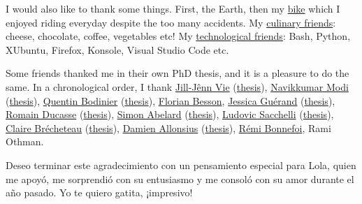 \begin{acknowledgements}
I would also like to thank some things. First, the Earth, then my \href{https://perso.crans.org/besson/zero-dechet/}{bike} which I enjoyed riding everyday despite the too many accidents.
My \href{https://perso.crans.org/besson/cuisine/}{culinary friends}: cheese, chocolate, coffee, vegetables etc!
My \href{https://perso.crans.org/besson/}{technological friends}: Bash, Python, XUbuntu, Firefox, Konsole, Visual Studio Code etc.


Some friends thanked me in their own PhD thesis, and it is a pleasure to do the same.
In a chronological order, I thank
\href{http://jill-jenn.net/}{Jill-Jênn Vie} (\href{http://jiji.cat/cat.pdf}{thesis}), \href{https://navikkumarmodi.wordpress.com/}{Navikkumar Modi} (\href{https://tel.archives-ouvertes.fr/tel-01668536/document}{thesis}), \href{https://quentinbodinier.wordpress.com/}{Quentin Bodinier} (\href{https://tel.archives-ouvertes.fr/tel-01731022/document}{thesis}), \href{https://paris-sorbonne.academia.edu/FBesson}{Florian Besson}, \href{https://sites.google.com/view/guerand}{Jessica Guérand} (\href{https://drive.google.com/open?id=17CBibM8ZlzIbyVxpxktK3j5rNePALUs8}{thesis}), \href{https://sites.google.com/view/ducasse/}{Romain Ducasse} (\href{https://drive.google.com/open?id=1u2oxRRimcO0jQfuYwSVwgKfcHU5DdoPK}{thesis}), \href{https://members.loria.fr/SAbelard/}{Simon Abelard} (\href{https://members.loria.fr/SAbelard/theseabelard.pdf}{thesis}), \href{http://www.cmap.polytechnique.fr/~sacchelli/}{Ludovic Sacchelli} (\href{https://tel.archives-ouvertes.fr/tel-01893068/document}{thesis}), \href{http://pages.saclay.inria.fr/claire.brecheteau/}{Claire Brécheteau} (\href{https://hal.archives-ouvertes.fr/tel-01897787/document}{thesis}), \href{http://www.i2m.univ-amu.fr/perso/damien.allonsius/}{Damien Allonsius} (\href{http://www.i2m.univ-amu.fr/perso/damien.allonsius/documents/recherche/these/Main.pdf}{thesis}), \href{https://remibonnefoi.wordpress.com/}{Rémi Bonnefoi}, Rami Othman.

Deseo terminar este agradecimiento con un pensamiento especial para Lola, quien me apoyó, me sorprendió con su entusiasmo y me consoló con su amor durante el año pasado.
Yo te quiero gatita, ¡impresivo!

\end{acknowledgements}
